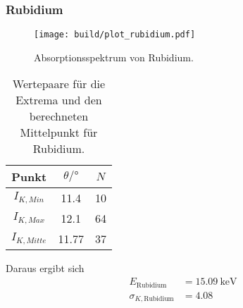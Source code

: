 \clearpage
\subsubsection*{Rubidium}
    \begin{figure}[H]
    \centering
    \texttt{[image: build/plot\_rubidium.pdf]}
    \caption{Absorptionsspektrum von Rubidium.}
\label{fig:rubidium}
\end{figure}
\begin{table}[H]                                                                                   
    \centering                                                                                     
        \caption{Wertepaare für die Extrema und den berechneten Mittelpunkt für Rubidium.}                      
        \label{tab:Rb}                                                                        
        \begin{tabular}{S S[table-format=2.2] S}                                                   
          \toprule                                                                                 
          {Punkt} & {$\theta /\si{\degree}$} & {$N$}\\                                            
          \midrule                                                                                 
          {$I_{K,Min  }$} &11.4&10\\
          {$I_{K,Max  }$} &12.1&64\\
          {$I_{K,Mitte}$} &11.77&37\\
          \bottomrule                                                                              
        \end{tabular}                                                                              
      \end{table}                                                                                  
Daraus ergibt sich                                                                                 
\begin{align*}                                                                                     
    E_\text{Rubidium} &= \SI{15.09}{\kilo\electronvolt}\\                  
    \sigma_{K, \text{Rubidium}} &= \num{4.08}                      
\end{align*}                                                                                       

